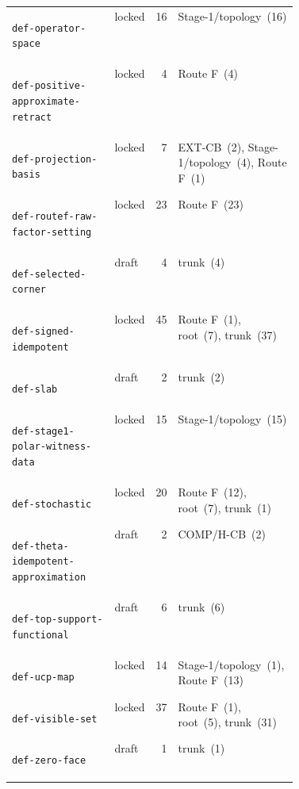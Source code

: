 \begin{longtable}{@{}l l r p{0.42\linewidth}@{}}
\hypertarget{dag:def-operator-space}{}\texttt{def-operator-space} & locked & 16 & Stage-1/topology~(16) \\
\hypertarget{dag:def-positive-approximate-retract}{}\texttt{def-positive-approximate-retract} & locked & 4 & Route F~(4) \\
\hypertarget{dag:def-projection-basis}{}\texttt{def-projection-basis} & locked & 7 & EXT-CB~(2), Stage-1/topology~(4), Route F~(1) \\
\hypertarget{dag:def-routef-raw-factor-setting}{}\texttt{def-routef-raw-factor-setting} & locked & 23 & Route F~(23) \\
\hypertarget{dag:def-selected-corner}{}\texttt{def-selected-corner} & draft & 4 & trunk~(4) \\
\hypertarget{dag:def-signed-idempotent}{}\texttt{def-signed-idempotent} & locked & 45 & Route F~(1), root~(7), trunk~(37) \\
\hypertarget{dag:def-slab}{}\texttt{def-slab} & draft & 2 & trunk~(2) \\
\hypertarget{dag:def-stage1-polar-witness-data}{}\texttt{def-stage1-polar-witness-data} & locked & 15 & Stage-1/topology~(15) \\
\hypertarget{dag:def-stochastic}{}\texttt{def-stochastic} & locked & 20 & Route F~(12), root~(7), trunk~(1) \\
\hypertarget{dag:def-theta-idempotent-approximation}{}\texttt{def-theta-idempotent-approximation} & draft & 2 & COMP/H-CB~(2) \\
\hypertarget{dag:def-top-support-functional}{}\texttt{def-top-support-functional} & draft & 6 & trunk~(6) \\
\hypertarget{dag:def-ucp-map}{}\texttt{def-ucp-map} & locked & 14 & Stage-1/topology~(1), Route F~(13) \\
\hypertarget{dag:def-visible-set}{}\texttt{def-visible-set} & locked & 37 & Route F~(1), root~(5), trunk~(31) \\
\hypertarget{dag:def-zero-face}{}\texttt{def-zero-face} & draft & 1 & trunk~(1) \\
\end{longtable}
\endgroup

